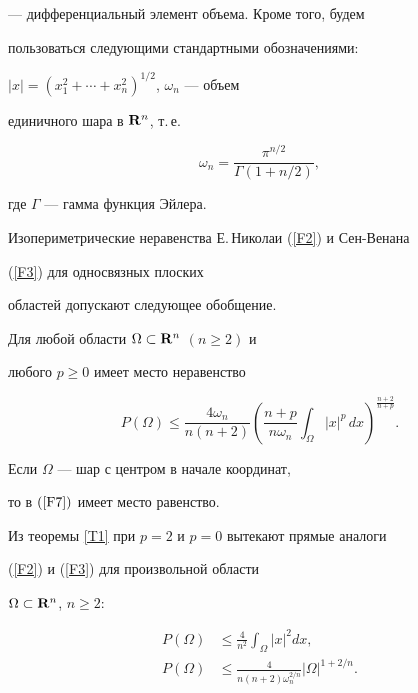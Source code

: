 --- дифференциальный элемент объема. Кроме того, будем


пользоваться следующими стандартными обозначениями:


$|x|=(x_1^2+\dotsb +x_n^2)^{1/2}$, $\omega_n$ --- объем


единичного шара в ${\bold R}^n$, т.\,е.


$$


\omega_n=\frac{\pi^{n/2}}{\Gamma (1+n/2)},


$$


где $\Gamma$ --- гамма функция Эйлера.





Изопериметрические неравенства Е.\,Николаи (\ref{F2}) и Сен-Венана


(\ref{F3}) для односвязных плоских


областей допускают следующее обобщение.








\begin{thm} \label{T1}


Для любой области $\Omega\subset {\bold R}^n$ $(n\geq  2)$ и


любого $p\geq 0$ имеет место неравенство


\begin{equation} \label{F7}


P(\Omega)\leq \frac{4\omega_n}{n(n+2)}


\left( {\frac{n+p}{n\omega_n}\int_\Omega |x|^p\, dx}


\right)^{\frac{n+2}{n+p}}.


\end{equation}


Если $\Omega$ --- шар с центром в начале координат, 


то в $(\ref{F7})$ имеет место равенство.


\end{thm}





Из теоремы \ref{T1}  при $p=2$ и $p=0$ вытекают прямые аналоги


(\ref{F2}) и (\ref{F3}) для произвольной области


$\Omega\subset{\bold R}^n$, $n\geq 2$:


\begin{align} \label{F8}


P(\Omega)&\leq \frac{4}{n^2}\int_\Omega |x|^2dx,\\


%


\label{F9}


P(\Omega)&\leq \frac{4}{n(n+2)\omega_n^{2/n}}|\Omega|^{1+2/n}.


\end{align}





